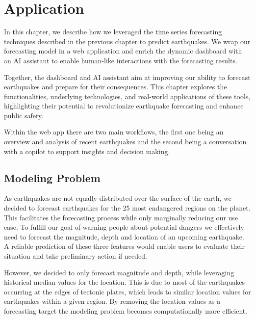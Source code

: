 \chapter{Application}
\label{ch:application}
In this chapter, we describe how we leveraged the time series forecasting techniques described in the previous chapter to predict earthquakes. We wrap our forecasting model in a web application and enrich the dynamic dashboard with an AI assistant to enable human-like interactions with the forecasting results.

Together, the dashboard and AI assistant aim at improving our ability to forecast earthquakes and prepare for their consequences. This chapter explores the functionalities, underlying technologies, and real-world applications of these tools, highlighting their potential to revolutionize earthquake forecasting and enhance public safety.

Within the web app there are two main workflows, the first one being an overview and analysis of recent earthquakes and the second being a conversation with a copilot to support insights and decision making.

\section{Modeling Problem}

As earthquakes are not equally distributed over the surface of the earth, we decided to forecast earthquakes for the 25 most endangered regions on the planet. This facilitates the forecasting process while only marginally reducing our use case. To fulfill our goal of warning people about potential dangers we effectively need to forecast the magnitude, depth and location of an upcoming earthquake. A reliable prediction of these three features would enable users to evaluate their situation and take preliminary action if needed.

However, we decided to only forecast magnitude and depth, while leveraging historical median values for the location. This is due to most of the earthquakes occurring at the edges of tectonic plates, which leads to similar location values for earthquakes within a given region. By removing the location values as a forecasting target the modeling problem becomes computationally more efficient. 

